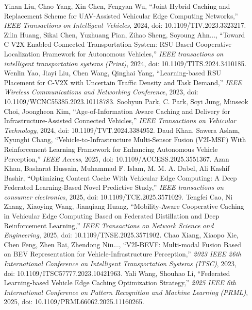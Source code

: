 Yinan Liu, Chao Yang, Xin Chen, Fengyan Wu, ``Joint Hybrid Caching and Replacement Scheme for UAV-Assisted Vehicular Edge Computing Networks,'' \textit{IEEE Transactions on Intelligent Vehicles}, 2024, doi: 10.1109/TIV.2023.3323217.
Zilin Huang, Sikai Chen, Yuzhuang Pian, Zihao Sheng, Soyoung Ahn..., ``Toward C-V2X Enabled Connected Transportation System: RSU-Based Cooperative Localization Framework for Autonomous Vehicles,'' \textit{IEEE transactions on intelligent transportation systems (Print)}, 2024, doi: 10.1109/TITS.2024.3410185.
Wenlin Yao, Jiayi Liu, Chen Wang, Qinghai Yang, ``Learning-based RSU Placement for C-V2X with Uncertain Traffic Density and Task Demand,'' \textit{IEEE Wireless Communications and Networking Conference}, 2023, doi: 10.1109/WCNC55385.2023.10118783.
Soohyun Park, C. Park, Soyi Jung, Minseok Choi, Joongheon Kim, ``Age-of-Information Aware Caching and Delivery for Infrastructure-Assisted Connected Vehicles,'' \textit{IEEE Transactions on Vehicular Technology}, 2024, doi: 10.1109/TVT.2024.3384952.
Daud Khan, Sawera Aslam, Kyunghi Chang, ``Vehicle-to-Infrastructure Multi-Sensor Fusion (V2I-MSF) With Reinforcement Learning Framework for Enhancing Autonomous Vehicle Perception,'' \textit{IEEE Access}, 2025, doi: 10.1109/ACCESS.2025.3551367.
Azan Khan, Basharat Hussain, Muhammad F. Islam, M. M. A. Dabel, Ali Kashif Bashir, ``Optimizing Content Cache With Vehicular Edge Computing: A Deep Federated Learning-Based Novel Predictive Study,'' \textit{IEEE transactions on consumer electronics}, 2025, doi: 10.1109/TCE.2025.3571029.
Tengfei Cao, Ni Zhang, Xiaoying Wang, Jianqiang Huang, ``Mobility-Aware Cooperative Caching in Vehicular Edge Computing Based on Federated Distillation and Deep Reinforcement Learning,'' \textit{IEEE Transactions on Network Science and Engineering}, 2025, doi: 10.1109/TNSE.2025.3571902.
Chao Xiang, Xiaopo Xie, Chen Feng, Zhen Bai, Zhendong Niu..., ``V2I-BEVF: Multi-modal Fusion Based on BEV Representation for Vehicle-Infrastructure Perception,'' \textit{2023 IEEE 26th International Conference on Intelligent Transportation Systems (ITSC)}, 2023, doi: 10.1109/ITSC57777.2023.10421963.
Yali Wang, Shouhao Li, ``Federated Learning-based Vehicle Edge Caching Optimization Strategy,'' \textit{2025 IEEE 6th International Conference on Pattern Recognition and Machine Learning (PRML)}, 2025, doi: 10.1109/PRML66062.2025.11160265.

